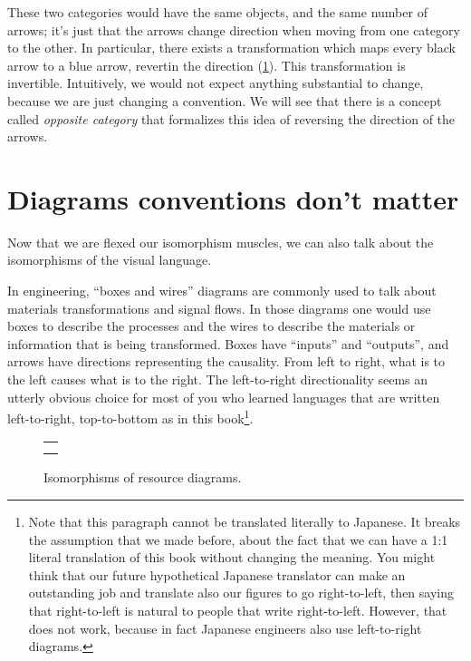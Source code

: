 These two categories would have the same objects, and the same number of arrows; it's just that the arrows change direction when moving from one category to the other.
In particular, there exists a transformation which maps every black arrow to a blue arrow, revertin the direction (\cref{fig:inverted_2}).
This transformation is invertible.
Intuitively, we would not expect anything substantial to change, because we are just changing a convention.
We will see that there is a concept called \emph{opposite category} that formalizes this idea of reversing the direction of the arrows.

\begin{figure}[h!]
    \centering
    \caption{}
    \label{fig:inverted_2}
\end{figure}

\section[Diagram conventions]{Diagrams conventions don't matter}

Now that we are flexed our isomorphism muscles, we can also talk about the isomorphisms of the visual language.

In engineering, ``boxes and wires'' diagrams are commonly used to talk about materials transformations and signal flows.
In those diagrams one would use boxes to describe the processes and the wires to describe the materials or information that is being transformed.
Boxes have ``inputs'' and ``outputs'', and arrows have directions representing the causality.
From left to right, what is to the left causes what is to the right.
The left-to-right directionality seems an utterly obvious choice for most of you who learned languages that are written left-to-right, top-to-bottom as in this book\footnote{
    Note that this paragraph cannot be translated literally to Japanese.
    It breaks the assumption that we made before, about the fact that we can have a 1:1 literal translation of this book without changing the meaning.
    You might think that our future hypothetical Japanese translator can make an outstanding job and translate also our figures to go right-to-left, then saying that right-to-left is natural to people that write right-to-left.
    However, that does not work, because in fact Japanese engineers also use left-to-right diagrams.
}.

\begin{figure}[h!]
    \centering
    \begin{tabular}{c}
        {20_iso_diags_1} \\
        {20_iso_diags_2}
    \end{tabular}
    \caption{Isomorphisms of resource diagrams.  }
    \label{fig:isodiagrams}
\end{figure}

